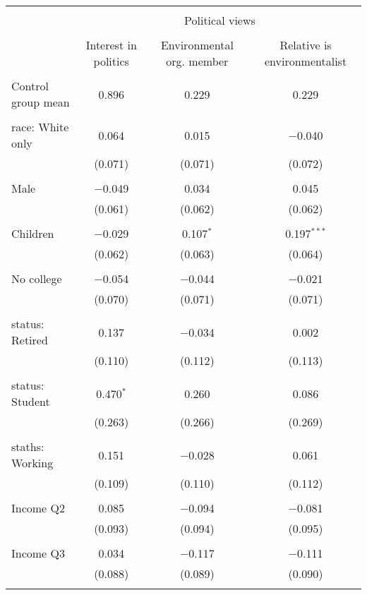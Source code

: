 
\begin{tabular}{@{\extracolsep{5pt}}lccc} 
\\[-1.8ex]\hline 
\hline \\[-1.8ex] 
 & \multicolumn{3}{c}{Political views} \\ 
\cline{2-4} 
\\[-1.8ex] & Interest in politics & Environmental org. member & Relative is environmentalist \\ 
\hline \\[-1.8ex] 
 Control group mean & 0.896 & 0.229 & 0.229  \\ \hline \\[-1.8ex] race: White only & 0.064 & 0.015 & $-$0.040 \\ 
  & (0.071) & (0.071) & (0.072) \\ 
  & & & \\ 
 Male & $-$0.049 & 0.034 & 0.045 \\ 
  & (0.061) & (0.062) & (0.062) \\ 
  & & & \\ 
 Children & $-$0.029 & 0.107$^{*}$ & 0.197$^{***}$ \\ 
  & (0.062) & (0.063) & (0.064) \\ 
  & & & \\ 
 No college & $-$0.054 & $-$0.044 & $-$0.021 \\ 
  & (0.070) & (0.071) & (0.071) \\ 
  & & & \\ 
 status: Retired & 0.137 & $-$0.034 & 0.002 \\ 
  & (0.110) & (0.112) & (0.113) \\ 
  & & & \\ 
 status: Student & 0.470$^{*}$ & 0.260 & 0.086 \\ 
  & (0.263) & (0.266) & (0.269) \\ 
  & & & \\ 
 staths: Working & 0.151 & $-$0.028 & 0.061 \\ 
  & (0.109) & (0.110) & (0.112) \\ 
  & & & \\ 
 Income Q2 & 0.085 & $-$0.094 & $-$0.081 \\ 
  & (0.093) & (0.094) & (0.095) \\ 
  & & & \\ 
 Income Q3 & 0.034 & $-$0.117 & $-$0.111 \\ 
  & (0.088) & (0.089) & (0.090) \\ 
  & & & \\ 

\end{tabular}
